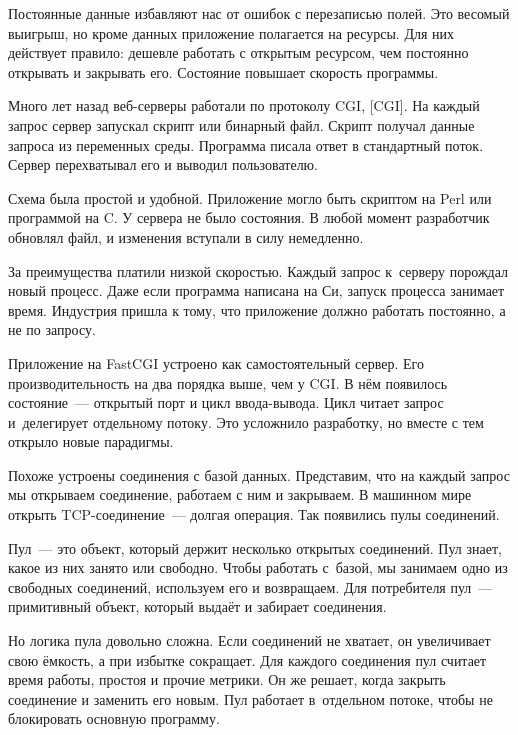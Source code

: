 
Постоянные данные избавляют нас от ошибок с перезаписью полей. Это весомый
выигрыш, но кроме данных приложение полагается на ресурсы. Для них действует
правило: дешевле работать с открытым ресурсом, чем постоянно открывать и
закрывать его. Состояние повышает скорость программы.


Много лет назад веб-серверы работали по протоколу CGI,
[CGI].
На каждый запрос сервер запускал скрипт или бинарный файл. Скрипт получал данные
запроса из переменных среды. Программа писала ответ в стандартный поток. Сервер
перехватывал его и выводил пользователю.

Схема была простой и удобной. Приложение могло быть скриптом на Perl или
программой на C\Plus\Plus. У сервера не было состояния. В любой момент
разработчик обновлял файл, и изменения вступали в силу немедленно.

За преимущества платили низкой скоростью. Каждый запрос к~серверу порождал новый
процесс. Даже если программа написана на Си, запуск процесса занимает
время. Индустрия пришла к тому, что приложение должно работать постоянно, а не
по запросу.


Приложение на FastCGI устроено как самостоятельный сервер. Его
производительность на два порядка выше, чем у CGI. В нём появилось состояние~---
открытый порт и цикл ввода-вывода. Цикл читает запрос и~делегирует отдельному
потоку. Это усложнило разработку, но вместе с тем открыло новые парадигмы.

Похоже устроены соединения с базой данных. Представим, что на каждый запрос мы
открываем соединение, работаем с ним и закрываем. В машинном мире открыть
TCP-соединение~--- долгая операция. Так появились пулы соединений.


Пул~--- это объект, который держит несколько открытых соединений. Пул знает,
какое из них занято или свободно. Чтобы работать с~базой, мы занимаем одно из
свободных соединений, используем его и возвращаем. Для потребителя пул~---
примитивный объект, который выдаёт и забирает соединения.

Но логика пула довольно сложна. Если соединений не хватает, он увеличивает свою
ёмкость, а при избытке сокращает. Для каждого соединения пул считает время
работы, простоя и прочие метрики. Он же решает, когда закрыть соединение и
заменить его новым. Пул работает в~отдельном потоке, чтобы не блокировать
основную программу.

